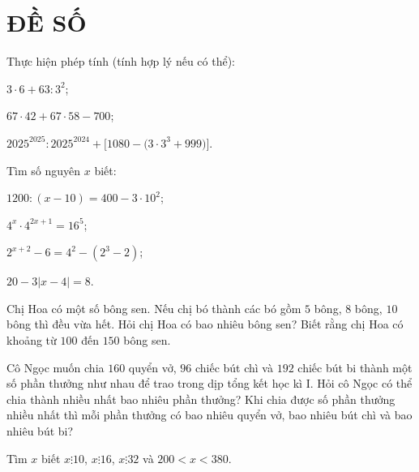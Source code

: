 \section{ĐỀ SỐ \thesection } %
\setcounter{bt}{0}

\begin{bt}
	 Thực hiện phép tính (tính hợp lý nếu có thể): 
	\begin{listEX}[2]
		\item $3\cdot 6+63:3^2$;
		\item $67\cdot 42+67\cdot 58-700$;
		\item $2025^{2025}:2025^{2024}+\bigl[1080-\bigl(3\cdot 3^3+999\bigr)\bigr]$.
	\end{listEX}
\end{bt}

\begin{bt}
	 Tìm số nguyên $x$ biết:
	\begin{listEX}[2]
		\item $1200:(x-10)=400-3\cdot 10^2$;
		\item $4^x\cdot 4^{2x+1}=16^5$;
		\item $2^{x+2}-6=4^2-(2^3-2)$;
		\item $20-3|x-4|=8$.
	\end{listEX}
\end{bt}

\begin{bt}
	Chị Hoa có một số bông sen. Nếu chị bó thành các bó gồm $5$ bông, $8$ bông, $10$ bông thì đều vừa hết. Hỏi chị Hoa có bao nhiêu bông sen? Biết rằng chị Hoa có khoảng từ $100$ đến $150$ bông sen.
\end{bt}

\begin{bt}
	
	Cô Ngọc muốn chia $160$ quyển vở, $96$ chiếc bút chì và $192$ chiếc bút bi thành một số phần thưởng như nhau để trao trong dịp tổng kết học kì I. Hỏi cô Ngọc có thể chia thành nhiều nhất bao nhiêu phần thưởng? Khi chia được số phần thưởng nhiều nhất thì mỗi phần thưởng có bao nhiêu quyển vở, bao nhiêu bút chì và bao nhiêu bút bi?
\end{bt}

\begin{bt}
	 Tìm $x$ biết $x \vdots 10$, $x \vdots 16$, $x \vdots 32$ và $200<x<380$.
\end{bt}

